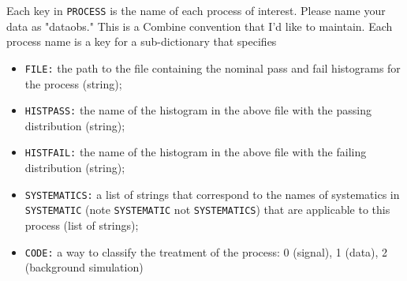 \documentclass[letter]{article}
\begin{document}
            Each key in \verb"PROCESS" is the name of each process of interest. Please name your data as "data\textunderscore obs." This is a Combine convention that I'd like to maintain. Each process name is a key for a sub-dictionary that specifies
            \begin{itemize}
                \item \verb"FILE:" the path to the file containing the nominal pass and fail histograms for the process (string);
                \item \verb"HISTPASS:" the name of the histogram in the above file with the passing distribution (string);
                \item \verb"HISTFAIL:" the name of the histogram in the above file with the failing distribution (string);
                \item \verb"SYSTEMATICS:" a list of strings that correspond to the names of systematics in \verb"SYSTEMATIC" (note \verb"SYSTEMATIC" not \verb"SYSTEMATICS") that are applicable to this process (list of strings);
                \item \verb"CODE:" a way to classify the treatment of the process: 0 (signal), 1 (data), 2 (background simulation)
            \end{itemize} 
\end{document}
